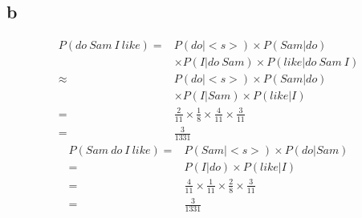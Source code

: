 \documentclass{article}
\begin{document}
    \subsection*{b}
    \begin{equation*}
        \begin{split}
            P(do \ Sam \ I \ like)=&P(do|<s>)\times P(Sam|do)\\
                            &\times P(I|do\ Sam)\times P(like|do\ Sam\ I)\\
                            \approx&P(do|<s>)\times P(Sam|do)\\
                            &\times P(I|Sam)\times P(like|I)\\
                            =&\frac{2}{11}\times\frac{1}{8}\times\frac{4}{11}\times\frac{3}{11}\\
                            =&\frac{3}{1331}
        \end{split}
    \end{equation*}
    \begin{equation*}
        \begin{split}
            P(Sam \ do\  I \ like)=&P(Sam|<s>)\times P(do|Sam)\\
                                =&P(I|do)\times P(like|I)\\
                                =&\frac{4}{11}\times\frac{1}{11}\times\frac{2}{8}\times\frac{3}{11}\\
                                =&\frac{3}{1331}
        \end{split}
    \end{equation*}
\end{document}
